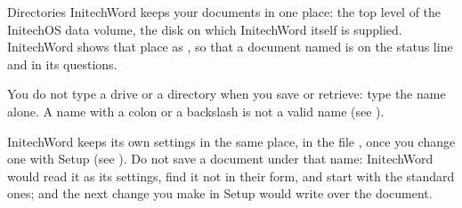 \begin{Feature}{Directories}
InitechWord keeps your documents in one place: the top level of the
InitechOS data volume, the disk on which InitechWord itself is supplied.
InitechWord shows that place as , so that a document named
 is  on the status line and in its questions.

You do not type a drive or a directory when you save or retrieve: type the
name alone.  A name with a colon or a backslash is not a valid name (see
).

\Notes
{}
InitechWord keeps its own settings in the same place, in the file
, once you change one with Setup (see ).  Do
not save a document under that name: InitechWord would read it as its
settings, find it not in their form, and start with the standard ones; and
the next change you make in Setup would write over the document.

\end{Feature}
